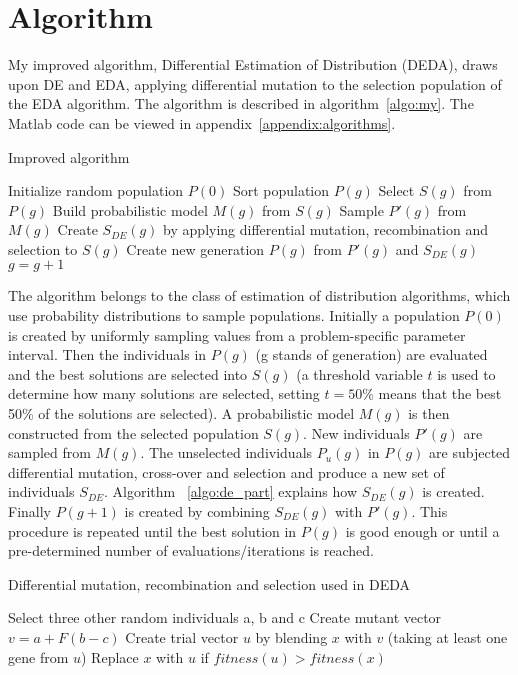 \section{Algorithm}

My improved algorithm, Differential Estimation of Distribution (DEDA), draws upon DE and EDA, applying differential mutation to the selection population of the EDA algorithm. The algorithm is described in algorithm~\ref{algo:my}. The Matlab code can be viewed in appendix~\ref{appendix:algorithms}.

\begin{algorithm}[h]
  \caption{Improved algorithm}
  \label{algo:my}
    \begin{algorithmic}
      \State Initialize random population $P(0)$
      \Repeat
        \State Sort population $P(g)$
        \State Select $S(g)$ from $P(g)$
        \State Build probabilistic model $M(g)$ from $S(g)$
        \State Sample $P'(g)$ from $M(g)$
        \State Create $S_{DE}(g)$ by applying differential mutation, recombination and selection to $S(g)$
        \State Create new generation $P(g)$ from $P'(g)$ and $S_{DE}(g)$
        \State $g=g+1$
    \end{algorithmic}
\end{algorithm}

The algorithm belongs to the class of estimation of distribution algorithms, which use probability distributions to sample populations. Initially a population $P(0)$ is created by uniformly sampling values from a problem-specific parameter interval. Then the individuals in $P(g)$ (g stands of generation) are evaluated and the best solutions are selected into $S(g)$ (a threshold variable $t$ is used to determine how many solutions are selected, setting $t=50\%$ means that the best 50\% of the solutions are selected). A probabilistic model $M(g)$ is then constructed from the selected population $S(g)$. New individuals $P'(g)$ are sampled from $M(g)$. The unselected individuals $P_u(g)$ in $P(g)$ are subjected differential mutation, cross-over and selection and produce a new set of individuals $S_{DE}$. Algorithm ~\ref{algo:de_part} explains how $S_{DE}(g)$ is created. Finally $P(g+1)$ is created by combining $S_{DE}(g)$ with $P'(g)$. This procedure is repeated until the best solution in $P(g)$ is good enough or until a pre-determined number of evaluations/iterations is reached.

\begin{algorithm}[h]
  \caption{Differential mutation, recombination and selection used in DEDA}
  \label{algo:de_part}
    \begin{algorithmic}
        \State Select three other random individuals a, b and c
        \State Create mutant vector $v=a+F(b-c)$
        \State Create trial vector $u$ by blending $x$ with $v$ (taking at least one gene from $u$)
        \State Replace $x$ with $u$ if $fitness(u) > fitness(x)$
      \EndFor
    \end{algorithmic}
\end{algorithm}

